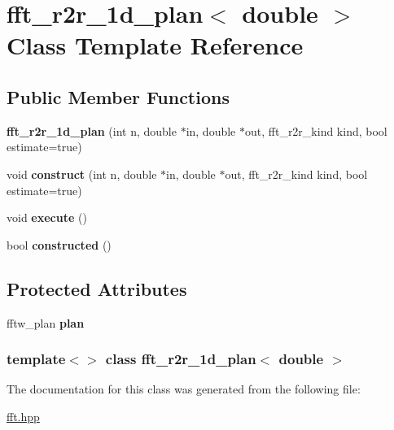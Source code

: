 \hypertarget{classfft__r2r__1d__plan_3_01double_01_4}{
\section{fft\_\-r2r\_\-1d\_\-plan$<$ double $>$ Class Template Reference}
\label{classfft__r2r__1d__plan_3_01double_01_4}
}
\subsection*{Public Member Functions}
\begin{DoxyCompactItemize}
\item 
\hypertarget{classfft__r2r__1d__plan_3_01double_01_4_afd03767e1f4f271dc95bbe9f192cc4d9}{
{\bfseries fft\_\-r2r\_\-1d\_\-plan} (int n, double $\ast$in, double $\ast$out, fft\_\-r2r\_\-kind kind, bool estimate=true)}
\label{classfft__r2r__1d__plan_3_01double_01_4_afd03767e1f4f271dc95bbe9f192cc4d9}

\item 
\hypertarget{classfft__r2r__1d__plan_3_01double_01_4_a6eeee11780f982e75dd7bec9ad76aa9f}{
void {\bfseries construct} (int n, double $\ast$in, double $\ast$out, fft\_\-r2r\_\-kind kind, bool estimate=true)}
\label{classfft__r2r__1d__plan_3_01double_01_4_a6eeee11780f982e75dd7bec9ad76aa9f}

\item 
\hypertarget{classfft__r2r__1d__plan_3_01double_01_4_abb2a98075eb18540200066c3e81ad241}{
void {\bfseries execute} ()}
\label{classfft__r2r__1d__plan_3_01double_01_4_abb2a98075eb18540200066c3e81ad241}

\item 
\hypertarget{classfft__r2r__1d__plan_3_01double_01_4_a2bfa463f3a9531fd8996e1b61a829e50}{
bool {\bfseries constructed} ()}
\label{classfft__r2r__1d__plan_3_01double_01_4_a2bfa463f3a9531fd8996e1b61a829e50}

\end{DoxyCompactItemize}
\subsection*{Protected Attributes}
\begin{DoxyCompactItemize}
\item 
\hypertarget{classfft__r2r__1d__plan_3_01double_01_4_a23dbeca06e85dcdfaabfd00e47bcac89}{
fftw\_\-plan {\bfseries plan}}
\label{classfft__r2r__1d__plan_3_01double_01_4_a23dbeca06e85dcdfaabfd00e47bcac89}

\end{DoxyCompactItemize}
\subsubsection*{template$<$$>$ class fft\_\-r2r\_\-1d\_\-plan$<$ double $>$}



The documentation for this class was generated from the following file:\begin{DoxyCompactItemize}
\item 
\hyperlink{fft_8hpp}{fft.hpp}\end{DoxyCompactItemize}

